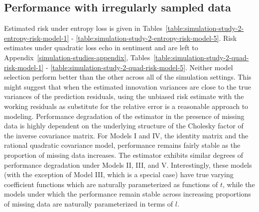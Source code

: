 %
\subsection{Performance with irregularly sampled data}
%

Estimated risk under entropy loss is given in Tables~\ref{table:simulation-study-2-entropy-risk-model-1} - \ref{table:simulation-study-2-entropy-risk-model-5}.  Risk estimates under quadratic loss echo in sentiment and are left to Appendix~\ref{simulation-studies-appendix}, Tables~\ref{table:simulation-study-2-quad-risk-model-1} - \ref{table:simulation-study-2-quad-risk-model-5}. Neither model selection perform better than the other across all of the simulation settings. This might suggest that when the estimated innovation variances are close to the true variances of the prediction residuals, using the unbiased risk estimate with the working residuals as substitute for the relative error is a reasonable approach to modeling. Performance degradation of the estimator in the presence of missing data is highly dependent on the underlying structure of the Cholesky factor of the inverse covariance matrix. For Models I and IV, the identity matrix and the rational quadratic covariance model, performance remains fairly stable as the proportion of missing data increases. The estimator exhibits similar degrees of performance degradation under Models II, III, and V.  Interestingly, these models (with the exception of Model III, which is a special case) have true varying coefficient functions which are naturally parameterized as functions of $t$, while the models under which the performance remain stable across increasing proportions of missing data are naturally parameterized in terms of $l$. 

